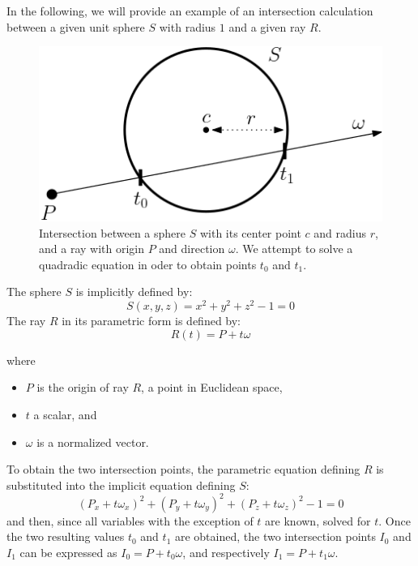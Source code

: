 In the following, we will provide an example of an intersection calculation between a given unit sphere $S$ with radius $1$ and a given ray $R$. 

\begin{figure}
	\centering
	\includegraphics[width=.5\linewidth]{img/1 fundamentals/sphere_isect.png}
	\caption{Intersection between a sphere $S$ with its center point $c$ and radius $r$, and a ray with origin $P$ and direction $\omega$. We attempt to solve a quadradic equation in oder to obtain points $t_{0}$ and $t_{1}$.} 
	\label{fig:sphere_isect}
\end{figure}

The sphere $S$ is implicitly defined by: 
\begin{equation} \label{eq:sphere}
S(x,y,z) = x^{2}+y^{2}+z^{2}-1 = 0
\end{equation}
The ray $R$ in its parametric form is defined by:
\begin{equation}\label{eq:ray}
R(t) = P + t\omega
\end{equation}

\noindent where
\begin{itemize}
	\setlength\itemsep{0.05em}
	\item  $P$ is the origin of ray $R$, a point in Euclidean space,
	\item  $t$ a scalar, and
	\item  $\omega$ is a normalized vector.
\end{itemize}

To obtain the two intersection points, the parametric equation defining $R$ is substituted into the implicit equation defining $S$:
\begin{equation}\label{eq:substitution}
(P_{x}+t\omega_{x})^{2}+(P_{y}+t\omega_{y})^{2}+(P_{z}+t\omega_{z})^{2}-1 = 0
\end{equation}
and then, since all variables with the exception of $t$ are known, solved for $t$.
Once the two resulting values $t_{0}$ and $t_{1}$ are obtained, the two intersection points $I_{0}$ and $I_{1}$ can be expressed as $I_{0} = P + t_{0}\omega$, and respectively $I_{1} = P + t_{1}\omega$.


